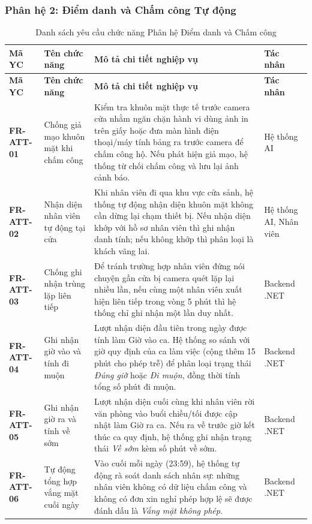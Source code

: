 \documentclass[12pt,a4paper]{article}
\begin{document}
\subsubsection{Phân hệ 2: Điểm danh và Chấm công Tự động}

\begin{longtable}{|C{\tabcolsep\relax}|L{\tabcolsep\relax}|L{\tabcolsep\relax}|C{\tabcolsep\relax}|}
\caption{Danh sách yêu cầu chức năng Phân hệ Điểm danh và Chấm công}\\
\hline
{}
\textbf{Mã YC} & \textbf{Tên chức năng} & \textbf{Mô tả chi tiết nghiệp vụ} & \textbf{Tác nhân} \\
\hline
\endfirsthead
\hline
{}
\textbf{Mã YC} & \textbf{Tên chức năng} & \textbf{Mô tả chi tiết nghiệp vụ} & \textbf{Tác nhân} \\
\hline
\endhead
\textbf{FR-ATT-01} & Chống giả mạo khuôn mặt khi chấm công & Kiểm tra khuôn mặt thực tế trước camera cửa nhằm ngăn chặn hành vi dùng ảnh in trên giấy hoặc đưa màn hình điện thoại/máy tính bảng ra trước camera để chấm công hộ. Nếu phát hiện giả mạo, hệ thống từ chối chấm công và lưu lại ảnh cảnh báo. & Hệ thống AI \\
\hline
{}
\textbf{FR-ATT-02} & Nhận diện nhân viên tự động tại cửa & Khi nhân viên đi qua khu vực cửa sảnh, hệ thống tự động nhận diện khuôn mặt không cần dừng lại chạm thiết bị. Nếu nhận diện khớp với hồ sơ nhân viên thì ghi nhận danh tính; nếu không khớp thì phân loại là khách vãng lai. & Hệ thống AI, Nhân viên \\
\hline
\textbf{FR-ATT-03} & Chống ghi nhận trùng lặp liên tiếp & Để tránh trường hợp nhân viên đứng nói chuyện gần cửa bị camera quét lặp lại nhiều lần, nếu cùng một nhân viên xuất hiện liên tiếp trong vòng 5 phút thì hệ thống chỉ ghi nhận một lần duy nhất. & Backend .NET \\
\hline
{}
\textbf{FR-ATT-04} & Ghi nhận giờ vào và tính đi muộn & Lượt nhận diện đầu tiên trong ngày được tính làm Giờ vào ca. Hệ thống so sánh với giờ quy định của ca làm việc (cộng thêm 15 phút cho phép trễ) để phân loại trạng thái \textit{Đúng giờ} hoặc \textit{Đi muộn}, đồng thời tính tổng số phút đi muộn. & Backend .NET \\
\hline
\textbf{FR-ATT-05} & Ghi nhận giờ ra và tính về sớm & Lượt nhận diện cuối cùng khi nhân viên rời văn phòng vào buổi chiều/tối được cập nhật làm Giờ ra ca. Nếu ra về trước giờ kết thúc ca quy định, hệ thống ghi nhận trạng thái \textit{Về sớm} kèm số phút về sớm. & Backend .NET \\
\hline
{}
\textbf{FR-ATT-06} & Tự động tổng hợp vắng mặt cuối ngày & Vào cuối mỗi ngày (23:59), hệ thống tự động rà soát danh sách nhân sự: những nhân viên không có dữ liệu chấm công và không có đơn xin nghỉ phép hợp lệ sẽ được đánh dấu là \textit{Vắng mặt không phép}. & Backend .NET \\
\hline
\end{longtable}
\end{document}
